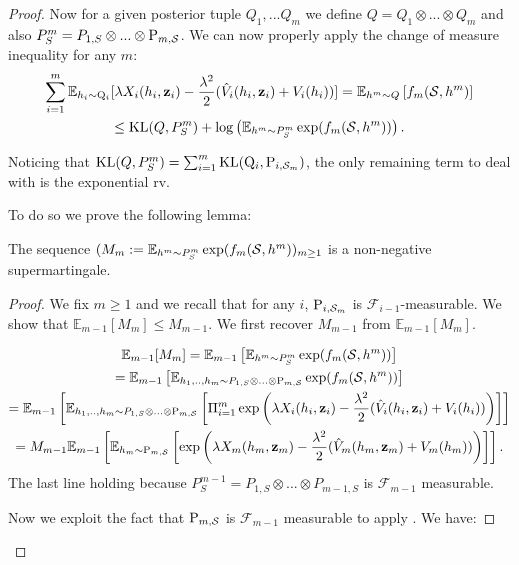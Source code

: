 \begin{noaddcontents}
\begin{proof}
   Now for a given posterior tuple $Q_1,...Q_m$ we define $Q= Q_1 \otimes ...\otimes Q_m$ and also $P^m_S = P_{1,S}\otimes...\otimes \P_{m,\S}$. We can now properly apply the change of measure inequality for any $m$:
   \begin{multline*}
    \sum_{i=1}^m \mathbb{E}_{h_i\sim \Q_{i}}[\lambda X_i(h_i,\z_i)  - \frac{\lambda^2}{2}(\hat{V}_i(h_i,\z_i) + V_i(h_i))]  = \mathbb{E}_{h^m\sim Q}\left[ f_m(\S,h^m) \right] \\
     \leq \operatorname{KL}(Q,P^m_S) + \log \left( \mathbb{E}_{h^m\sim P^m_S}\exp(f_m(\S,h^m))  \right).
   \end{multline*}
 
   Noticing that $\operatorname{KL}(Q,P^m_S)= \sum_{i=1}^m \operatorname{KL}(\Q_{i},\P_{i,\Sm})$, the only remaining term to deal with is the exponential rv.

   To do so we prove the following lemma:

   \begin{lemma}
     The sequence $(M_m:=\mathbb{E}_{h^m\sim P^m_S}\exp(f_m(\S,h^m))_{m\geq 1}$ is a non-negative supermartingale.
   \end{lemma}
   \begin{proof}
   We fix $m\geq 1$ and we recall that for any $i$, $\P_{i,\Sm}$ is $\mathcal{F}_{i-1}$-measurable. We show that $\mathbb{E}_{m-1}[M_m] \leq M_{m-1}$. We first recover $M_{m-1}$ from $\mathbb{E}_{m-1}[M_m]$.

     \begin{multline*}
       \mathbb{E}_{m-1}[M_m] =\mathbb{E}_{m-1}\left[\mathbb{E}_{h^m\sim P^m_S}\exp(f_m(\S,h^m))\right] \\
        = \mathbb{E}_{m-1}\left[\mathbb{E}_{h_1,..,h_m\sim P_{1,S}\otimes...\otimes \P_{m,\S}}\exp(f_m(\S,h^m))\right] \\
        = \mathbb{E}_{m-1}\left[\mathbb{E}_{h_1,..,h_m\sim P_{1,S}\otimes...\otimes \P_{m,\S}}\left[\Pi_{i=1}^m\exp\left(\lambda X_i(h_i,\z_i)  - \frac{\lambda^2}{2}(\hat{V}_i(h_i,\z_i) + V_i(h_i))\right)\right] \right] \\
         = M_{m-1} \mathbb{E}_{m-1}\left[ \mathbb{E}_{h_m\sim \P_{m,\S}}\left[\exp\left(\lambda X_m(h_m,\z_m)  - \frac{\lambda^2}{2}(\hat{V}_m(h_m,\z_m) + V_m(h_m))\right) \right]\right].
     \end{multline*}
 The last line holding because $P^{m-1}_S = P_{1,S}\otimes...\otimes P_{m-1,S}$ is $\mathcal{F}_{m-1}$ measurable.


   Now we exploit the fact that $\P_{m,\S}$ is $\mathcal{F}_{m-1}$ measurable to apply . We have:


\end{proof}
\end{proof}
\end{noaddcontents}

